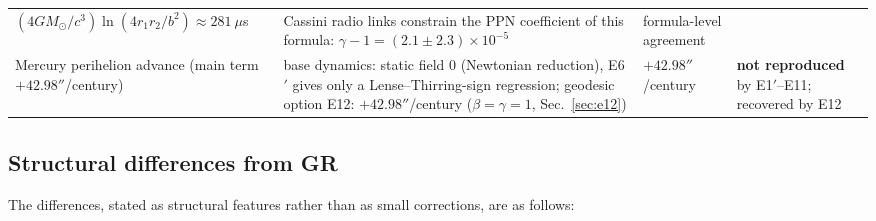 \documentclass[aps,reprint,amsmath,amssymb,nofootinbib,superscriptaddress,floatfix]{revtex4-2}
\begin{document}
\begin{table}[t]
\begin{ruledtabular}
\begin{tabular}{p{}p{}p{}p{}}
$(4GM_\odot/c^3)\ln(4r_1r_2/b^2) \approx 281\ \mu$s &
Cassini radio links constrain the PPN coefficient of this formula:
$\gamma - 1 = (2.1 \pm 2.3)\times10^{-5}$~\cite{Bertotti2003} &
formula-level agreement \\
Mercury perihelion advance (main term $+42.98''$/century) &
base dynamics: static field $0$ (Newtonian reduction), E6$'$ gives
only a Lense--Thirring-sign regression; geodesic option E12:
$+42.98''$/century ($\beta = \gamma = 1$, Sec.~\ref{sec:e12}) &
$+42.98''$/century &
\textbf{not reproduced} by E1$'$--E11; recovered by E12 \\
\end{tabular}
\end{ruledtabular}
\end{table}

\subsection{Structural differences from GR}
\label{sec:diff}

The differences, stated as structural features rather than as small
corrections, are as follows:
\end{document}
